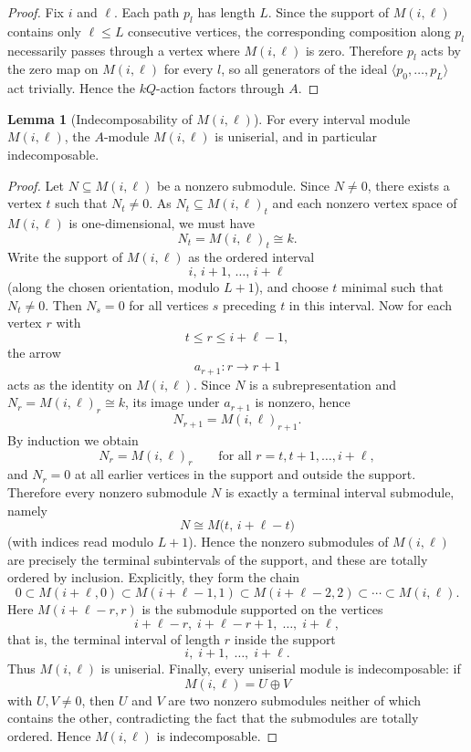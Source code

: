\documentclass{article}
\theoremstyle{definition}
\newtheorem{lemma}[theorem]{Lemma}
\begin{document}
\begin{proof}
Fix $i$ and $\ell$. Each path $p_l$ has length $L$.
Since the support of $M(i,\ell)$ contains only $\ell\le L$ consecutive vertices, the corresponding composition along $p_l$ necessarily passes through a vertex where $M(i,\ell)$ is zero.
Therefore $p_l$ acts by the zero map on $M(i,\ell)$ for every $l$, so all generators of the ideal $\langle p_0,\dots,p_{L}\rangle$ act trivially.
Hence the $kQ$-action factors through $A$.
\end{proof}
\begin{lemma}[Indecomposability of $M(i,\ell)$]\label{lem:Miell-uniserial}
For every interval module $M(i,\ell)$, the $A$-module $M(i,\ell)$ is uniserial, and in particular indecomposable.
\end{lemma}

\begin{proof}
Let $N\subseteq M(i,\ell)$ be a nonzero submodule. Since $N\neq 0$, there exists a vertex
$t$ such that $N_t\neq 0$. As $N_t\subseteq M(i,\ell)_t$ and each nonzero vertex space
of $M(i,\ell)$ is one-dimensional, we must have
\[
N_t=M(i,\ell)_t\cong k.
\]
\noindent
Write the support of $M(i,\ell)$ as the ordered interval
\[
i,\, i+1,\, \dots,\, i+\ell
\]
(along the chosen orientation, modulo $L+1$), and choose $t$ minimal such that
$N_t\neq 0$. Then $N_s=0$ for all vertices $s$ preceding $t$ in this interval.
\noindent
Now for each vertex $r$ with
\[
t\le r\le i+\ell-1,
\]
the arrow
\[
a_{r+1}\colon r\to r+1
\]
acts as the identity on $M(i,\ell)$. Since $N$ is a subrepresentation and
$N_r=M(i,\ell)_r\cong k$, its image under $a_{r+1}$ is nonzero, hence
\[
N_{r+1}=M(i,\ell)_{r+1}.
\]
By induction we obtain
\[
N_r=M(i,\ell)_r
\qquad\text{for all } r=t,t+1,\dots,i+\ell,
\]
and $N_r=0$ at all earlier vertices in the support and outside the support.
\noindent
Therefore every nonzero submodule $N$ is exactly a terminal interval submodule,
namely
\[
N \cong M\bigl(t,\, i+\ell-t\bigr)
\]
(with indices read modulo $L+1$). Hence the nonzero submodules of $M(i,\ell)$
are precisely the terminal subintervals of the support, and these are totally
ordered by inclusion. Explicitly, they form the chain
\[
0
\subset
M(i+\ell,0)
\subset
M(i+\ell-1,1)
\subset
M(i+\ell-2,2)
\subset
\cdots
\subset
M(i,\ell).
\]
\noindent
Here $M(i+\ell-r,r)$ is the submodule supported on the vertices
\[
i+\ell-r,\; i+\ell-r+1,\; \dots,\; i+\ell,
\]
that is, the terminal interval of length $r$ inside the support
\[
i,\; i+1,\; \dots,\; i+\ell.
\]
Thus $M(i,\ell)$ is uniserial.
\noindent
Finally, every uniserial module is indecomposable: if
\[
M(i,\ell)=U\oplus V
\]
with $U,V\neq 0$, then $U$ and $V$ are two nonzero submodules neither of which
contains the other, contradicting the fact that the submodules are totally
ordered. Hence $M(i,\ell)$ is indecomposable.
\end{proof}
\end{document}
